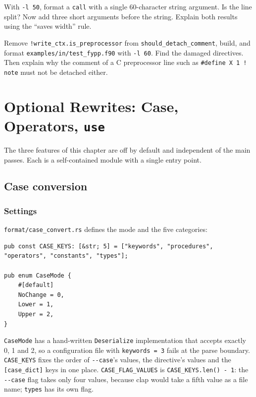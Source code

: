 \documentclass[11pt,a4paper,openany]{book}
\newcommand{\code}[1]{\texttt{\small #1}}
\newcommand{\file}[1]{\texttt{\small\color{accent}#1}}
\newcommand{\flag}[1]{\texttt{\small -{}-#1}}
\newcounter{exercise}[chapter]
\begin{document}
\begin{exercise}
With \code{-l 50}, format a \code{call} with a single 60-character string
argument. Is the line split? Now add three short arguments before the string.
Explain both results using the ``saves width'' rule.
\end{exercise}

\begin{exercise}
Remove \code{!write\_ctx.is\_preprocessor} from \code{should\_detach\_comment},
build, and format \file{examples/in/test\_fypp.f90} with \code{-l 60}. Find
the damaged directives. Then explain why the comment of a C preprocessor line
such as \code{\#define X 1 ! note} must not be detached either.
\end{exercise}
\chapter{Optional Rewrites: Case, Operators, \texttt{use}}\label{ch:rewrites}

The three features of this chapter are off by default and independent of the
main passes. Each is a self-contained module with a single entry point.

\section{Case conversion}

\subsection{Settings}

\file{format/case\_convert.rs} defines the mode and the five categories:

\begin{lstlisting}[style=rust]
pub const CASE_KEYS: [&str; 5] = ["keywords", "procedures", "operators", "constants", "types"];

pub enum CaseMode {
    #[default]
    NoChange = 0,
    Lower = 1,
    Upper = 2,
}
\end{lstlisting}

\code{CaseMode} has a hand-written \code{Deserialize} implementation that
accepts exactly 0, 1 and 2, so a configuration file with \code{keywords = 3}
fails at the parse boundary. \code{CASE\_KEYS} fixes the order of
\flag{case}'s values, the directive's values and the \code{[case\_dict]} keys
in one place. \code{CASE\_FLAG\_VALUES} is \code{CASE\_KEYS.len() - 1}: the
\flag{case} flag takes only four values, because clap would take a fifth
value as a file name; \code{types} has its own flag.
\end{document}
